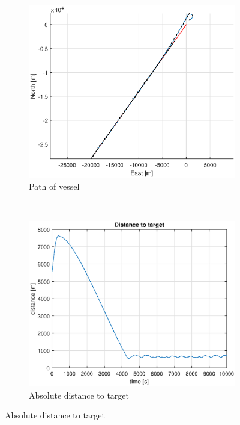 \begin{figure}[ht]
	\begin{subfigure}[b]{0.3\textwidth}
		\includegraphics[width=\textwidth]{path_2_7}
		\caption{Path of vessel}
		\label{fig:path_2_6}
	\end{subfigure}%
        ~
	\begin{subfigure}[b]{0.3\textwidth}
		\includegraphics[width=\textwidth]{distance_to_target2_7}
		\caption{Absolute distance to target}
		\label{fig:distance_to_target2_7}
	\end{subfigure}
	\label{fig:task2_6}%

\end{figure}
